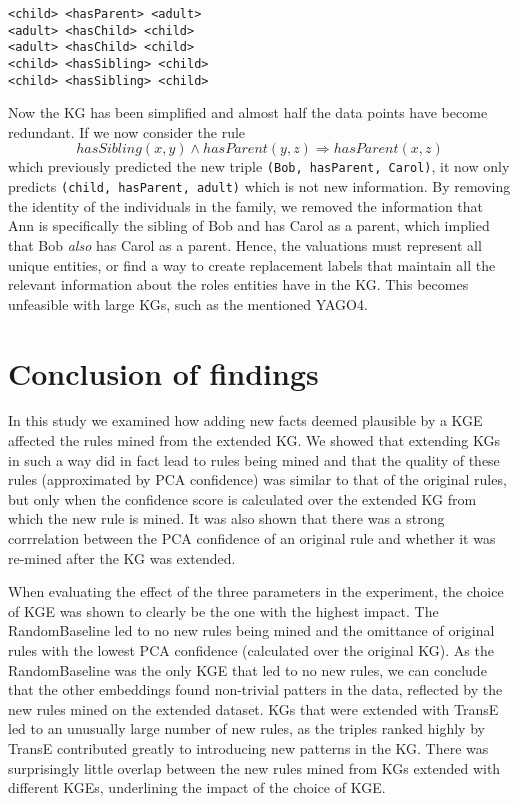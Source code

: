 \begin{example}
\begin{lstlisting}[]
<child> <hasParent> <adult>
<adult> <hasChild> <child>
<adult> <hasChild> <child>
<child> <hasSibling> <child>
<child> <hasSibling> <child>
\end{lstlisting}
\label{mini_simple_KG_rules}
\end{example}

Now the KG has been simplified and almost half the data points have become redundant. If we now consider the rule \[hasSibling(x, y) \wedge hasParent(y,z) \Rightarrow hasParent(x,z)\] which previously predicted the new triple \texttt{(Bob, hasParent, Carol)}, it now only predicts \texttt{(child, hasParent, adult)} which is not new information. By removing the identity of the individuals in the family, we removed the information that Ann is specifically the sibling of Bob and has Carol as a parent, which implied that Bob \textit{also} has Carol as a parent. Hence, the valuations must represent all unique entities, or find a way to create replacement labels that maintain all the relevant information about the roles entities have in the KG. This becomes unfeasible with large KGs, such as the mentioned YAGO4.


\section{Conclusion of findings}
In this study we examined how adding new facts deemed plausible by a KGE affected the rules mined from the extended KG. We showed that extending KGs in such a way did in fact lead to rules being mined and that the quality of these rules (approximated by PCA confidence) was similar to that of the original rules, but only when the confidence score is calculated over the extended KG from which the new rule is mined. It was also shown that there was a strong corrrelation between the PCA confidence of an original rule and whether it was re-mined after the KG was extended.

When evaluating the effect of the three parameters in the experiment, the choice of KGE was shown to clearly be the one with the highest impact. The RandomBaseline led to no new rules being mined and the omittance of original rules with the lowest PCA confidence (calculated over the original KG). As the RandomBaseline was the only KGE that led to no new rules, we can conclude that the other embeddings found non-trivial patters in the data, reflected by the new rules mined on the extended dataset. KGs that were extended with TransE led to an unusually large number of new rules, as the triples ranked highly by TransE contributed greatly to introducing new patterns in the KG. There was surprisingly little overlap between the new rules mined from KGs extended with different KGEs, underlining the impact of the choice of KGE.

